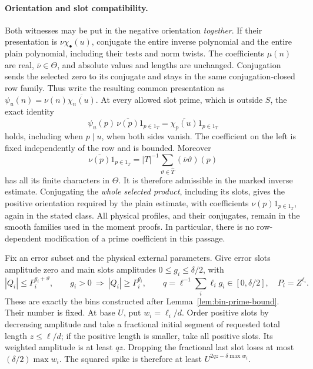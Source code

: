\documentclass[12pt]{article}
\begin{document}
\paragraph{Orientation and slot compatibility.}
Both witnesses may be put in the negative orientation \emph{together}.
If their presentation is \(\nu\chi_\bullet(u)\), conjugate the entire
inverse polynomial and the entire plain polynomial, including their
tests and norm twists.  The coefficients \(\mu(n)\) are real,
\(\overline\nu\in\Theta\), and absolute values and lengths are unchanged.
Conjugation sends the selected zero to its conjugate and stays in
the same conjugation-closed row family.  Thus write the resulting
common presentation as \(\psi_u(n)=\nu(n)\overline{\chi_n(u)}\).
At every allowed slot prime, which is outside \(S\), the exact identity
\[
 \psi_u(p)\,\overline{\nu(p)}1_{p\in1_T}
       =\overline{\chi_p(u)}1_{p\in1_T}
\]
holds, including when \(p\mid u\), when both sides vanish.
The coefficient on the left is fixed independently of the row and
is bounded.  Moreover
\[
 \overline{\nu(p)}1_{p\in1_T}
   =|T|^{-1}\sum_{\vartheta\in\widehat T}
                    (\overline\nu\vartheta)(p)
\]
has all its finite characters in \(\Theta\).  It is therefore admissible
in the marked inverse estimate.  Conjugating the \emph{whole selected
product}, including its slots, gives the positive orientation required
by the plain estimate, with coefficients
\(\nu(p)1_{p\in1_T}\), again in the stated class.
All physical profiles, and their conjugates, remain in the smooth
families used in the moment proofs.  In particular, there is no
row-dependent modification of a prime coefficient in this passage.

Fix an error subset and the physical external parameters.
Give error slots amplitude zero and main slots amplitudes
\(0\le g_i\le\delta/2\), with
\[
 |Q_i|\le P_i^{g_i+\vartheta},\qquad
 g_i>0\ \Longrightarrow\ |Q_i|\ge P_i^{g_i},\qquad
 q=\ell^{-1}\sum_i\ell_i g_i\in[0,\delta/2],\quad P_i=Z^{\ell_i}.
\]
These are exactly the bins constructed after Lemma~\ref{lem:bin-prime-bound}.
Their number is fixed.  At base \(U\), put \(w_i=\ell_i/d\).
Order positive slots by decreasing amplitude and take a fractional
initial segment of requested total length \(z\le\ell/d\);
if the positive length is smaller, take all positive slots.
Its weighted amplitude is at least \(qz\).
Dropping the fractional last slot loses at most
\((\delta/2)\max w_i\).  The squared spike is therefore at least
\(U^{2qz-\delta\max w_i}\).
\end{document}
